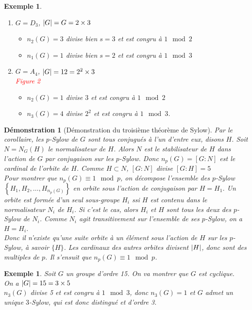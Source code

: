 \documentclass[a4paper, oneside]{report}
\theoremstyle{break}
\newtheorem{exemple}[thm]{Exemple}
\newtheorem*{demonstration}{Démonstration}
\newcommand{\red}[1]{\textcolor{red}{#1}}
\DeclarePairedDelimiter\ens{\left\{ }{\right\} }%
\DeclarePairedDelimiter\abs{\lvert}{\rvert}%
\renewcommand{\ens}[1]{\left\{ #1 \right\} }%
\begin{document}
\begin{exemple}
\begin{enumerate}
\item $G = D_3$, $\abs{G} = G = 2 \times 3$
\begin{itemize}
\item $n_2(G) = 3$ divise bien $s = 3$ et est congru à $1 \mod 2$

\item $n_1(G) = 1$ divise bien $s = 2$ et est congru à $1 \mod 3$
\end{itemize}

\medbreak

\item $G = A_4$, $\abs{G} = 12 = 2^2 \times 3$\\
\red{Figure 2}
\begin{itemize}
\item $n_2(G) = 1$ divise $3$ et est congru à $1 \mod 2$

\item $n_3(G) = 4$ divise $2^2$ et est congru à $1 \mod 3$.
\end{itemize}
\end{enumerate}
\end{exemple}

\begin{demonstration}[Démonstration du troisième théorème de Sylow]
Par le corollaire, les $p$-Sylow de $G$ sont tous conjugués à l'un d'entre eux, disons $H$. Soit $N = N_G(H)$ le normalisateur de $H$. Alors $N$ est le stabilisateur de $H$ dans l'action de $G$ par conjugaison sur les $p$-Sylow. Donc $n_p(G) = [G:N]$ est le cardinal de l'orbite de $H$. Comme $H \subset N$, $[G:N]$ divise $[G:H] = 5$\\
Pour montrer que $n_p(G) \equiv 1 \mod p$, on décompose l'ensemble des $p$-Sylow $\ens{H_1, H_2, \ldots, H_{n_p(G)}}$ en orbite sous l'action de conjugaison par $H = H_1$. Un orbite est formée d'un seul sous-groupe $H_i$ ssi $H$ est contenu dans le normalisateur  $N_i$ de $H_i$. Si c'est le cas, alors $H_i$ et $H$ sont tous les deux des $p$-Sylow de $N_i$. Comme $N_i$ agit transitivement sur l'ensemble de ses $p$-Sylow, on a $H = H_i$.\\
Donc il n'existe qu'une suite orbite à un élément sous l'action de $H$ sur les $p$-Sylow, à savoir $\{H\}$. Les cardinaux des autres orbites divisent $\abs{H}$, donc sont des multiples de $p$. Il s'ensuit que $n_p(G) \equiv 1 \mod p$.
\end{demonstration}

\begin{exemple}
Soit $G$ un groupe d'ordre 15. On va montrer que $G$ est cyclique.\\
On a $\abs{G} = 15 = 3 \times 5$\\
$n_3(G)$ divise 5 et est congru à $1 \mod 3$, donc $n_3(G) = 1$ et $G$ admet un unique $3$-Sylow, qui est donc distingué et d'ordre 3.
\end{exemple}
\end{document}
